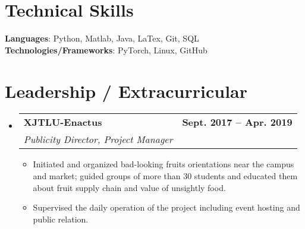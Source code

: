 \documentclass[letterpaper,11pt]{article}
\makeatletter
\newcommand{\resumeItem}[1]{
  \item\small{
    {#1 \vspace{-2pt}}
  }
}
\newcommand{\resumeSubheading}[4]{
  \vspace{-2pt}\item
    \begin{tabular*}{1.0\textwidth}[t]{l@{\extracolsep{\fill}}r}
      \textbf{#1} & \textbf{\small #2} \\
      \textit{\small#3} & \textit{\small #4} \\
    \end{tabular*}\vspace{-7pt}
}
\newcommand{\resumeSubHeadingListStart}{\begin{itemize}[leftmargin=0.0in, label={}]}
\newcommand{\resumeSubHeadingListEnd}{\end{itemize}}
\newcommand{\resumeItemListStart}{\begin{itemize}}
\newcommand{\resumeItemListEnd}{\end{itemize}\vspace{-5pt}}
\makeatother
\begin{document}
\vspace{-16pt}


\section{Technical Skills}
 \begin{itemize}[leftmargin=0.15in, label={}]
    \small{\item{
     \textbf{Languages}{: Python, Matlab, Java, LaTex, Git, SQL} \\
     \textbf{Technologies/Frameworks}{: PyTorch, Linux, GitHub} \\
    }}
 \end{itemize}
 \vspace{-16pt}


\section{Leadership / Extracurricular}
    \resumeSubHeadingListStart
        \resumeSubheading{XJTLU-Enactus}{Sept. 2017 -- Apr. 2019}{Publicity Director, Project Manager}{}
            \resumeItemListStart
                \resumeItem{Initiated and organized bad-looking fruits orientations near the campus and market; guided groups of more than 30 students and educated them about fruit supply chain and value of unsightly food.}
                \resumeItem{Supervised the daily operation of the project including event hosting and public relation.}
            \resumeItemListEnd
        
    \resumeSubHeadingListEnd
\end{document}
